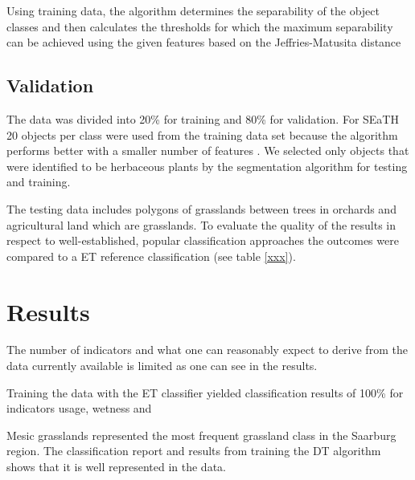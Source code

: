 \documentclass[authoryear, review,12pt,number]{elsarticle}
\begin{document}
Using training data, the algorithm determines the separability of the object 
classes and then calculates the thresholds for which the maximum separability 
can be achieved using the given features based on the Jeffries-Matusita 
distance 







\subsection{Validation} 
The data was divided into 20\% for training and 80\% for validation. For SEaTH
20 objects per class were used from the training data set because the algorithm
performs better with a smaller number of features \citep{Nussbaum2006}. We 
selected only objects that were identified to be herbaceous plants by the 
segmentation algorithm for testing and training. 

The testing 
data includes polygons of grasslands between trees in orchards and 
agricultural land which are grasslands. To evaluate the quality of the results
in respect to well-established, popular classification approaches the outcomes
 were compared to a ET reference classification (see table \ref{xxx}).
 

\section{Results}
The number of indicators and what one can reasonably expect to derive from the
data currently available is limited as one can see in the results.

Training the data with the ET classifier yielded classification results of
100\% for indicators usage, wetness and

Mesic grasslands represented the most frequent grassland class in the Saarburg 
region. The classification report and results from training the DT algorithm  
shows that it is well represented in the data.
\end{document}
